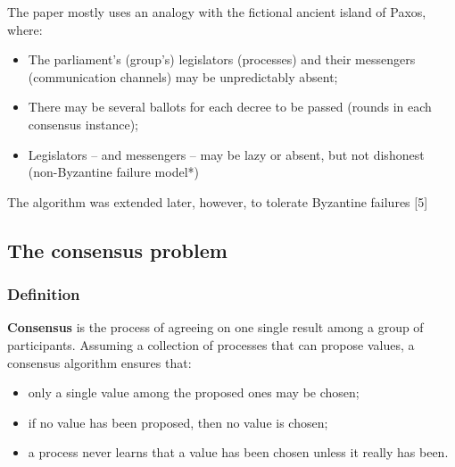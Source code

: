 \documentclass[10 pt]{beamer}
\begin{document}
\begin{frame}

  The paper mostly uses an analogy with the fictional ancient island of Paxos, where:
  \begin{itemize}
    \item The parliament's (group's) legislators (processes) and their messengers (communication channels) may be unpredictably absent;
    \item There may be several ballots for each decree to be passed (rounds in each consensus instance);
    \item Legislators -- and messengers -- may be lazy or absent, but not dishonest (non-Byzantine failure model*)
  \end{itemize}
  \vspace{6 mm}
  {\small * The algorithm was extended later, however, to tolerate Byzantine failures [5]}
\end{frame}




\subsection{The consensus problem}


\begin{frame}
  \frametitle{Definition}
  
  \textbf{Consensus} is the process of agreeing on one single result among a group of participants. Assuming a collection of processes that can propose values, a consensus algorithm ensures that:
  
  \begin{itemize}
    \item only a single value among the proposed ones may be chosen;
    \item if no value has been proposed, then no value is chosen;
    \item a process never learns that a value has been chosen unless it really has been.
  \end{itemize}



\end{frame}
\end{document}
